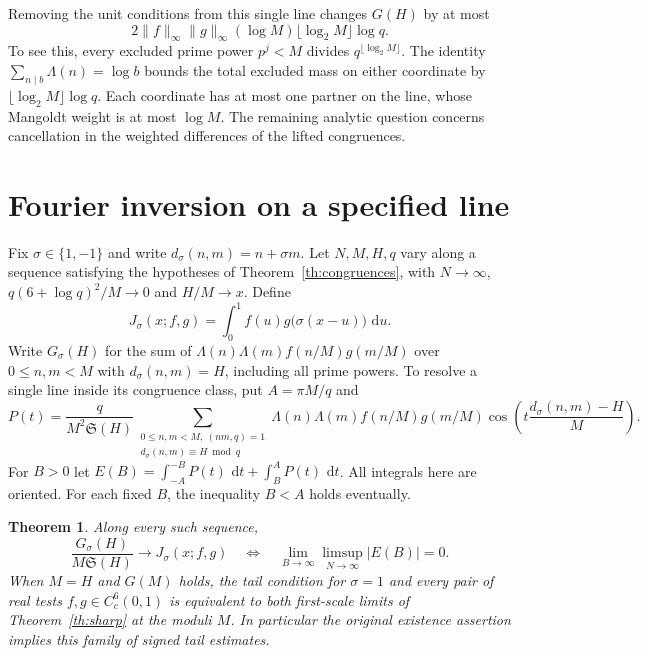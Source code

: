 \documentclass[11pt,a4paper]{article}
\newtheorem{theorem}{Theorem}[section]
\newcommand{\SSg}{\mathfrak S}
\newcommand{\dd}{\,\mathrm d}
\begin{document}
Removing the unit conditions from this single line changes $G(H)$ by
at most
\[
 2\|f\|_\infty\|g\|_\infty(\log M)\lfloor\log_2 M\rfloor\log q .
\]
To see this, every excluded prime power $p^j<M$ divides
$q^{\lfloor\log_2 M\rfloor}$. The identity
$\sum_{n\mid b}\Lambda(n)=\log b$ bounds the total excluded mass on
either coordinate by $\lfloor\log_2 M\rfloor\log q$. Each coordinate
has at most one partner on the line, whose Mangoldt weight is at most
$\log M$. The remaining analytic question concerns cancellation in
the weighted differences of the lifted congruences.

\section{Fourier inversion on a specified line}\label{sec:frequency}

Fix $\sigma\in\{1,-1\}$ and write $d_\sigma(n,m)=n+\sigma m$.
Let $N,M,H,q$ vary along a sequence satisfying the hypotheses of
Theorem~\ref{th:congruences}, with $N\to\infty$,
$q(6+\log q)^2/M\to0$ and $H/M\to x$. Define
\[
 J_\sigma(x;f,g)=\int_0^1 f(u)g\bigl(\sigma(x-u)\bigr)\,\dd u .
\]
Write $G_\sigma(H)$ for the sum of
$\Lambda(n)\Lambda(m)f(n/M)g(m/M)$ over $0\le n,m<M$ with
$d_\sigma(n,m)=H$, including all prime powers. To resolve a single
line inside its congruence class, put $A=\pi M/q$ and
\[
 P(t)=\frac{q}{M^2\SSg(H)}
 \sum_{\substack{0\le n,m<M,\ (nm,q)=1\\d_\sigma(n,m)\equiv H\bmod q}}
 \Lambda(n)\Lambda(m) f(n/M)g(m/M)
 \cos\!\left(t\frac{d_\sigma(n,m)-H}{M}\right).
\]
For $B>0$ let $E(B)=\int_{-A}^{-B}P(t)\,\dd t+
\int_B^A P(t)\,\dd t$. All integrals here are oriented. For each fixed
$B$, the inequality $B<A$ holds eventually.

\begin{theorem}\label{th:frequency}
Along every such sequence,
\[
 \frac{G_\sigma(H)}{M\SSg(H)}\longrightarrow J_\sigma(x;f,g)
 \quad\Longleftrightarrow\quad
 \lim_{B\to\infty}\limsup_{N\to\infty}|E(B)|=0 .
\]
When $M=H$ and $G(M)$ holds, the tail condition for $\sigma=1$ and
every pair of real tests $f,g\in C_c^6(0,1)$ is equivalent to
both first-scale limits of Theorem~\ref{th:sharp} at the moduli $M$.
In particular the original existence assertion implies this family
of signed tail estimates.
\end{theorem}
\end{document}
